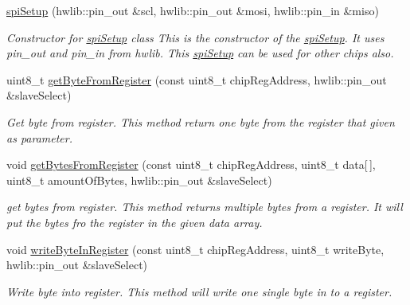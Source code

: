 \begin{DoxyCompactItemize}
\item 
\mbox{\label{classspiSetup_a4acc1a08e4a3ce57cb145b2fec525325}} 
\hyperlink{classspiSetup_a4acc1a08e4a3ce57cb145b2fec525325}{spi\+Setup} (hwlib\+::pin\+\_\+out \&scl, hwlib\+::pin\+\_\+out \&mosi, hwlib\+::pin\+\_\+in \&miso)
\begin{DoxyCompactList}\small\item\em Constructor for \hyperlink{classspiSetup}{spi\+Setup} class  This is the constructor of the \hyperlink{classspiSetup}{spi\+Setup}. It uses pin\+\_\+out and pin\+\_\+in from hwlib. This \hyperlink{classspiSetup}{spi\+Setup} can be used for other chips also. \end{DoxyCompactList}\item 
\mbox{\label{classspiSetup_afa9946c86604d9a95eceddae9ee5a925}} 
uint8\+\_\+t \hyperlink{classspiSetup_afa9946c86604d9a95eceddae9ee5a925}{get\+Byte\+From\+Register} (const uint8\+\_\+t chip\+Reg\+Address, hwlib\+::pin\+\_\+out \&slave\+Select)
\begin{DoxyCompactList}\small\item\em Get byte from register.  This method return one byte from the register that given as parameter. \end{DoxyCompactList}\item 
\mbox{\label{classspiSetup_a48b98f5bd3fc4e9027bffae2c4f138b9}} 
void \hyperlink{classspiSetup_a48b98f5bd3fc4e9027bffae2c4f138b9}{get\+Bytes\+From\+Register} (const uint8\+\_\+t chip\+Reg\+Address, uint8\+\_\+t data\mbox{[}$\,$\mbox{]}, uint8\+\_\+t amount\+Of\+Bytes, hwlib\+::pin\+\_\+out \&slave\+Select)
\begin{DoxyCompactList}\small\item\em get bytes from register.  This method returns multiple bytes from a register. It will put the bytes fro the register in the given data array. \end{DoxyCompactList}\item 
\mbox{\label{classspiSetup_adb8e42b2a067b674f3d280a3ed108fe2}} 
void \hyperlink{classspiSetup_adb8e42b2a067b674f3d280a3ed108fe2}{write\+Byte\+In\+Register} (const uint8\+\_\+t chip\+Reg\+Address, uint8\+\_\+t write\+Byte, hwlib\+::pin\+\_\+out \&slave\+Select)
\begin{DoxyCompactList}\small\item\em Write byte into register.  This method will write one single byte in to a register. \end{DoxyCompactList}\item 

\end{DoxyCompactItemize}

